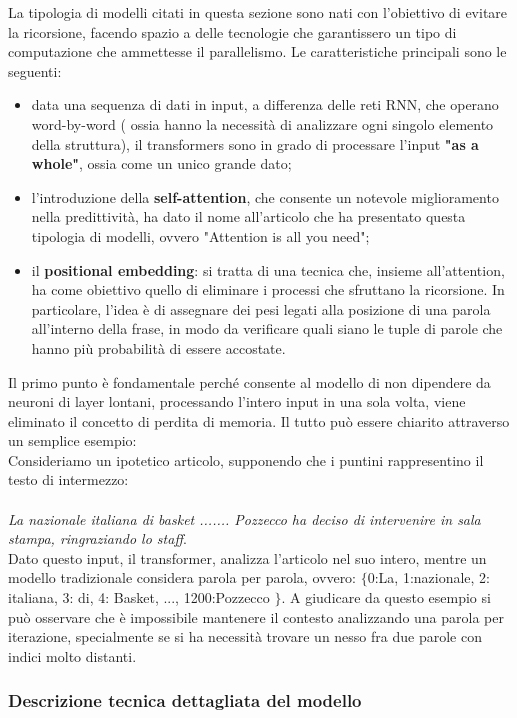 La tipologia di modelli citati in questa sezione sono nati con l'obiettivo di evitare la ricorsione, facendo spazio a delle tecnologie che garantissero un tipo di computazione che ammettesse il parallelismo. Le caratteristiche principali sono le seguenti:
\begin{itemize}
	\item data una sequenza di dati in input, a differenza delle reti RNN, che operano word-by-word ( ossia hanno la necessità di analizzare ogni singolo elemento della struttura), il transformers sono in grado di processare l'input \textbf{"as a whole"}, ossia come un unico grande dato;
	\item l'introduzione della \textbf{self-attention}, che consente un notevole miglioramento nella predittività, ha dato il nome all'articolo che ha presentato questa tipologia di modelli, ovvero "Attention is all you need";
	\item il \textbf{positional embedding}: si tratta di una tecnica che, insieme all'attention, ha come obiettivo quello di eliminare i processi che sfruttano la ricorsione. In particolare, l'idea è di assegnare dei pesi legati alla posizione di una parola all'interno della frase, in modo da verificare quali siano le tuple di parole che hanno più probabilità di essere accostate.
\end{itemize}

Il primo punto è fondamentale perché consente al modello di non dipendere da neuroni di layer lontani, processando l'intero input in una sola volta, viene eliminato il concetto di perdita di memoria. Il tutto può essere chiarito attraverso un semplice esempio:
\\
Consideriamo un ipotetico articolo, supponendo che i puntini rappresentino il testo di intermezzo: 
\\\\ \textit{La nazionale italiana di basket ....... Pozzecco ha deciso di intervenire in sala stampa, ringraziando lo staff}.\\

Dato questo input, il transformer, analizza l'articolo nel suo intero, mentre un modello tradizionale considera parola per parola, ovvero: $\{$0:La, 1:nazionale, 2: italiana, 3: di, 4: Basket, ..., 1200:Pozzecco $\}$. A giudicare da questo esempio si può osservare che è impossibile mantenere il contesto analizzando una parola per iterazione, specialmente se si ha necessità trovare un nesso fra due parole con indici molto distanti. 
 
\subsubsection{Descrizione tecnica dettagliata del modello}

